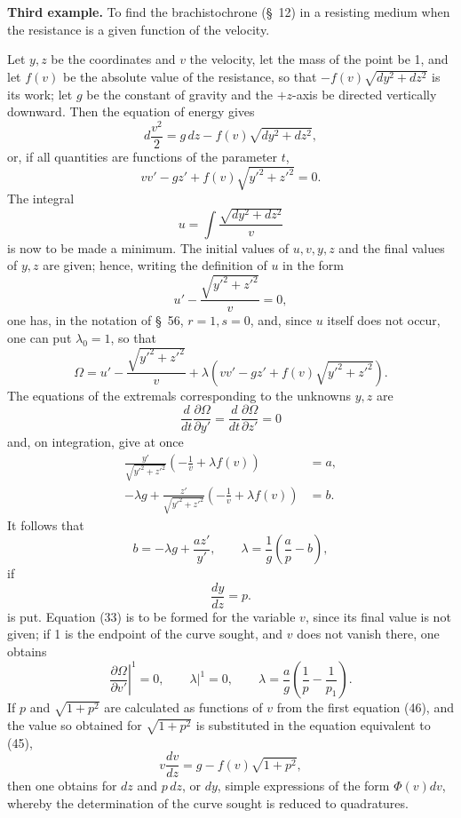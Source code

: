 \documentclass[11pt,a4paper,leqno]{article}
\begin{document}
\noindent\textbf{Third example.} To find the brachistochrone (\S~12) in a resisting medium when the resistance is a given function of the velocity.

Let $y,z$ be the coordinates and $v$ the velocity, let the mass of the point be 1, and let $f(v)$ be the absolute value of the resistance, so that $-f(v)\sqrt{dy^2+dz^2}$ is its work; let $g$ be the constant of gravity and the $+z$-axis be directed vertically downward. Then the equation of energy gives
\[
d\frac{v^2}{2}=g\,dz-f(v)\sqrt{dy^2+dz^2},
\]
or, if all quantities are functions of the parameter $t$,
\begin{equation}\tag{45}
vv'-gz'+f(v)\sqrt{y'^2+z'^2}=0.
\end{equation}
The integral
\[
u=\int\frac{\sqrt{dy^2+dz^2}}{v}
\]
is now to be made a minimum. The initial values of $u,v,y,z$ and the final values of $y,z$ are given; hence, writing the definition of $u$ in the form
\[
u'-\frac{\sqrt{y'^2+z'^2}}{v}=0,
\]
one has, in the notation of \S~56, $r=1,s=0$, and, since $u$ itself does not occur, one can put $\lambda_0=1$, so that
\[
\Omega=u'-\frac{\sqrt{y'^2+z'^2}}{v}
+\lambda\left(vv'-gz'+f(v)\sqrt{y'^2+z'^2}\right).
\]
The equations of the extremals corresponding to the unknowns $y,z$ are
\[
\frac{d}{dt}\frac{\partial\Omega}{\partial y'}
=\frac{d}{dt}\frac{\partial\Omega}{\partial z'}=0
\]
and, on integration, give at once
\begin{equation}\tag{46}
\begin{aligned}
\frac{y'}{\sqrt{y'^2+z'^2}}\left(-\frac1v+\lambda f(v)\right)&=a,\\
-\lambda g+\frac{z'}{\sqrt{y'^2+z'^2}}\left(-\frac1v+\lambda f(v)\right)&=b.
\end{aligned}
\end{equation}
It follows that
\[
b=-\lambda g+\frac{az'}{y'},\qquad
\lambda=\frac1g\left(\frac ap-b\right),
\]
if
\[
\frac{dy}{dz}=p.
\]
is put. Equation (33) is to be formed for the variable $v$, since its final value is not given; if 1 is the endpoint of the curve sought, and $v$ does not vanish there, one obtains
\[
\left.\frac{\partial\Omega}{\partial v'}\right|^1=0,\qquad
\left.\lambda\right|^1=0,\qquad
\lambda=\frac ag\left(\frac1p-\frac1{p_1}\right).
\]
If $p$ and $\sqrt{1+p^2}$ are calculated as functions of $v$ from the first equation (46), and the value so obtained for $\sqrt{1+p^2}$ is substituted in the equation equivalent to (45),
\[
v\frac{dv}{dz}=g-f(v)\sqrt{1+p^2},
\]
then one obtains for $dz$ and $p\,dz$, or $dy$, simple expressions of the form $\Phi(v)dv$, whereby the determination of the curve sought is reduced to quadratures.
\end{document}
